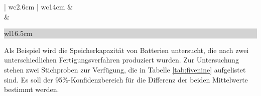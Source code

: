 \begin{table}[H]
{\begin{tabular}{| wc{2.6cm} | wc{14cm} }
  &
\selectfont{Bestimmung des Konfidenzintervalls} \\ \xrowht{25pt}
&   \\ \hline

\end{tabular}%
}\bigskip
\label{tab:fiveeight}
\end{table}

\noindent
\colorbox{lightgray}{%
%
\renewcommand\arraystretch{0.6}%
\begin{tabular}{ wl{16.5cm} }
{\selectfont
{}}
\end{tabular}%
}\bigskip

\noindent Als Beispiel wird die Speicherkapazit\"{a}t von Batterien untersucht, die nach zwei unterschiedlichen Fertigungsverfahren produziert wurden. Zur Untersuchung stehen zwei Stichproben zur Verf\"{u}gung, die in Tabelle \ref{tab:fivenine} aufgelistet sind. Es soll der 95\%-Konfidenzbereich f\"{u}r die Differenz der beiden Mittelwerte bestimmt werden. 

